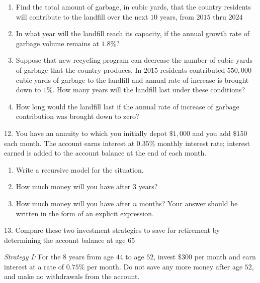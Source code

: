 \documentclass[10pt,]{book}
\theoremstyle{plain}
\theoremstyle{definition}
\theoremstyle{definition}
\theoremstyle{definition}
\numberwithin{equation}{section}
\begin{document}
\begin{exerciselist}
\leavevmode%
\begin{enumerate}[label=(\alph*)]
\item\hypertarget{li-89}{}Find the total amount of garbage, in cubic yards, that the country residents will contribute to the landfill over the next \(10\) years, from \(2015\) thru \(2024\)%
\item\hypertarget{li-90}{}In what year will the landfill reach its capacity, if the annual growth rate of garbage volume remains at \(1.8\%\)?%
\item\hypertarget{li-91}{}Suppose that new recycling program can decrease the number of cubic yards of garbage that the country produces. In \(2015\) residents contributed \(550,000\) cubic yards of garbage to the landfill and annual rate of increase is brought down to \(1\%\).  How many years will the landfill last under these conditions?%
\item\hypertarget{li-92}{}How long would the landfill last if the annual rate of increase of garbage contribution was brought down to zero?%
\end{enumerate}
\par\smallskip
\item[12.]\hypertarget{exercise-43}{}\hypertarget{p-184}{}%
You have an annuity to which you initially depot \(\$1,000\) and you add \(\$150\) each month. The account earns interest at \(0.35\%\) monthly interest rate; interest earned is added to the account balance at the end of each month.%
\leavevmode%
\begin{enumerate}[label=(\alph*)]
\item\hypertarget{li-93}{}Write a recursive model for the situation.%
\item\hypertarget{li-94}{}How much money will you have after \(3\) years?%
\item\hypertarget{li-95}{}How much money will you have after \(n\) months? Your answer should be written in the form of an explicit expression.%
\end{enumerate}
\par\smallskip
\item[13.]\hypertarget{exercise-44}{}\hypertarget{p-185}{}%
Compare these two investment strategies to save for retirement by determining the account balance at age \(65\)%
\par
\hypertarget{p-186}{}%
\emph{Strategy I:} For the \(8\) years from age \(44\) to age \(52\), invest \(\$300\) per month and earn interest at a rate of \(0.75\%\) per month. Do not save any more money after age \(52\), and make no withdrawals from the account.%

\end{exerciselist}
\end{document}
